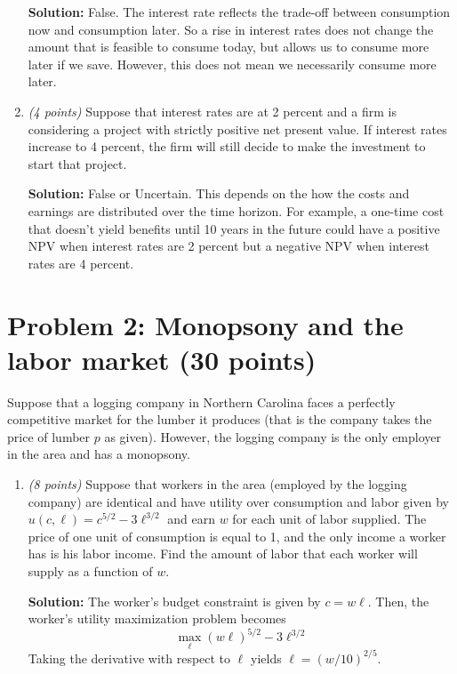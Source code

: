 \documentclass{article}
\begin{document}
\begin{enumerate}
\textbf{Solution:} False. The interest rate reflects the trade-off between consumption now and consumption later. So a rise in interest rates does not change the amount that is feasible to consume today, but allows us to consume more later if we save. However, this does not mean we necessarily consume more later.

\item \emph{(4 points)} Suppose that interest rates are at 2 percent and a firm is considering a project with strictly positive net present value. If interest rates increase to 4 percent, the firm will still decide to make the investment to start that project.

\textbf{Solution:} False or Uncertain. This depends on the how the costs and earnings are distributed over the time horizon. For example, a one-time cost that doesn’t yield benefits until 10 years in the future could have a positive NPV when interest rates are 2 percent but a negative NPV when interest rates are 4 percent.
\end{enumerate}

\section*{Problem 2: Monopsony and the labor market (30 points)}

Suppose that a logging company in Northern Carolina faces a perfectly competitive market for the lumber it produces (that is the company takes the price of lumber $p$ as given). However, the logging company is the only employer in the area and has a monopsony.

\begin{enumerate}
\item \emph{(8 points)} Suppose that workers in the area (employed by the logging company) are identical and have utility over consumption and labor given by $u(c, \ell) = c^{5/2} - 3\ell^{3/2}$ and earn $w$ for each unit of labor supplied. The price of one unit of consumption is equal to 1, and the only income a worker has is his labor income. Find the amount of labor that each worker will supply as a function of $w$.

\textbf{Solution:} The worker’s budget constraint is given by $c = w\ell$. Then, the worker’s utility maximization problem becomes \[ \max_{\ell} (w\ell)^{5/2} - 3\ell^{3/2} \] Taking the derivative with respect to $\ell$ yields $\ell = (w/10)^{2/5}$.
\end{enumerate}

\end{document}
